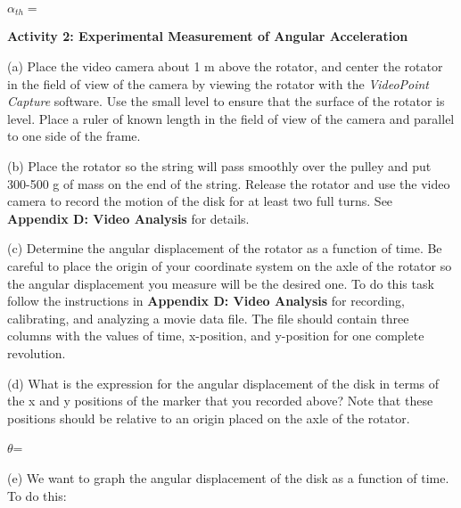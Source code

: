 \( \alpha _{th}= \)
\vspace{5mm}

\textbf{Activity 2: Experimental Measurement of Angular Acceleration} 

(a) Place the video camera about 1 m above the rotator, and center the rotator in the field of view of the camera by viewing the rotator with the \textit{VideoPoint Capture} software. Use the small level to ensure that the surface of the rotator is level. Place a ruler of known length in the field of view of the camera and parallel to one side of the frame.

(b) Place the rotator so the string will pass smoothly over the pulley and put
300-500 g of mass on the end of the string. Release the rotator and use the
video camera to record the motion of the disk for at least two full turns. See
\textbf{Appendix D: Video Analysis} for details.

(c) Determine the angular displacement of the rotator as a function of time.
Be careful to place the origin of your coordinate system on the axle of the
rotator so the angular displacement you measure will be the desired one. To
do this task follow the instructions in \textbf{Appendix D: Video Analysis}
for recording, calibrating, and analyzing a movie data file. The file should contain three columns with the values of time, x-position, and y-position for one complete revolution.

(d) What is the expression for the angular displacement of the disk in terms
of the x and y positions of the marker that you recorded above? Note that these
positions should be relative to an origin placed on the axle of the rotator.
\vspace{5mm}

\( \theta  \)= 
\vspace{5mm}

(e) We want to graph the angular displacement of the disk as a function of time.
To do this:


